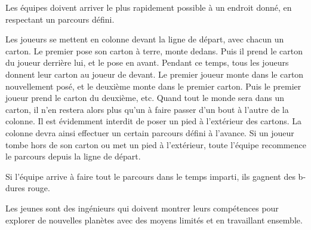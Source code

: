 \documentclass{grand-jeu}
\begin{document}
\begin{liste-materiel}
\end{liste-materiel}

\begin{regles}
Les équipes doivent arriver le plus rapidement possible à un endroit donné, en respectant un parcours défini.

Les joueurs se mettent en colonne devant la ligne de départ, avec chacun un carton. Le premier pose son carton à terre, monte dedans. Puis il prend le carton du joueur derrière lui, et le pose en avant. Pendant ce temps, tous les joueurs donnent leur carton au joueur de devant. Le premier joueur monte dans le carton nouvellement posé, et le deuxième monte dans le premier carton. Puis le premier joueur prend le carton du deuxième, etc. Quand tout le monde sera dans un carton, il n’en restera alors plus qu’un à faire passer d’un bout à l’autre de la colonne. Il est évidemment interdit de poser un pied à l’extérieur des cartons. La colonne devra ainsi effectuer un certain parcours défini à l’avance. Si un joueur tombe hors de son carton ou met un pied à l’extérieur, toute l’équipe recommence le parcours depuis la ligne de départ.

Si l'équipe arrive à faire tout le parcours dans le temps imparti, ils gagnent des b-dures rouge.
\end{regles}

\begin{imaginaire}
Les jeunes sont des ingénieurs qui doivent montrer leurs compétences pour explorer de nouvelles planètes avec des moyens limités et en travaillant ensemble.
\end{imaginaire}

\begin{moments-stop}
\end{moments-stop}
\end{document}
